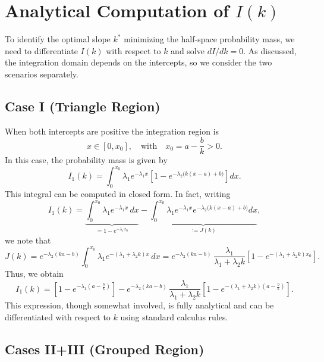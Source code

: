 \section{Analytical Computation of \( I(k) \)}

To identify the optimal slope \( k^* \) minimizing the half-space probability mass, we need to differentiate \( I(k) \) with respect to \( k \) and solve \( dI/dk=0 \). As discussed, the integration domain depends on the intercepts, so we consider the two scenarios separately.

\subsection*{Case I (Triangle Region)}

When both intercepts are positive the integration region is 
\[
x\in\left[0,x_0\right],\quad \text{with}\quad x_0=a-\frac{b}{k}>0.
\]
In this case, the probability mass is given by
\begin{equation}\label{eq:Ik_case1}
  I_1(k)=\int_{0}^{x_0} \lambda_1 e^{-\lambda_1 x}\left[ 1-e^{-\lambda_2\bigl(k(x-a)+b\bigr)} \right]dx.
\end{equation}
This integral can be computed in closed form. In fact, writing
\[
I_1(k)=\underbrace{\int_{0}^{x_0} \lambda_1 e^{-\lambda_1 x}\,dx}_{=1-e^{-\lambda_1x_0}} - \underbrace{\int_{0}^{x_0} \lambda_1 e^{-\lambda_1 x}e^{-\lambda_2\bigl(k(x-a)+b\bigr)}dx}_{:=J(k)},
\]
we note that
\[
J(k)=e^{-\lambda_2(ka-b)}\int_{0}^{x_0} \lambda_1 e^{-(\lambda_1+\lambda_2k)x}\,dx 
= e^{-\lambda_2(ka-b)}\,\frac{\lambda_1}{\lambda_1+\lambda_2k}\left[1-e^{-(\lambda_1+\lambda_2k)x_0}\right].
\]
Thus, we obtain
\[
I_1(k)=\left[1-e^{-\lambda_1\left(a-\frac{b}{k}\right)}\right] - e^{-\lambda_2(ka-b)}\,\frac{\lambda_1}{\lambda_1+\lambda_2k}\left[1-e^{-(\lambda_1+\lambda_2k)\left(a-\frac{b}{k}\right)}\right].
\]
This expression, though somewhat involved, is fully analytical and can be differentiated with respect to \( k \) using standard calculus rules.

\subsection*{Cases II+III (Grouped Region)}

